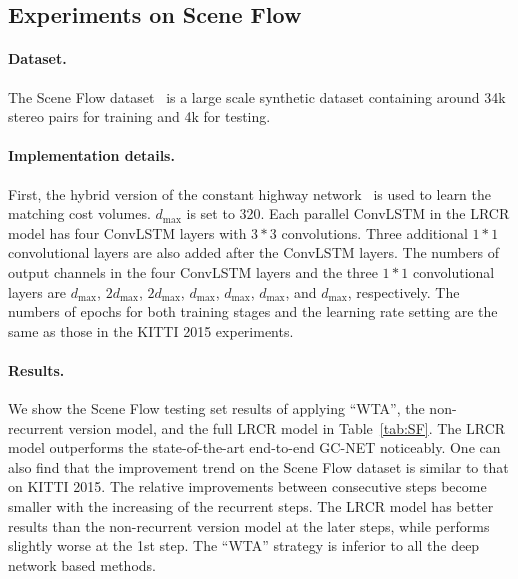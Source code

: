 \documentclass[10pt,twocolumn,letterpaper]{article}
\begin{document}
 \subsection{Experiments on Scene Flow}
 \label{sec:experimentSCENEFLOW}
\paragraph{Dataset.} The Scene Flow dataset~\cite{mayer2016large} is a large scale synthetic dataset containing around 34k stereo pairs for training and 4k for testing.
\vspace{-0.2cm}
\paragraph{Implementation details.} First, the hybrid version of the constant highway network~\cite{shaked2016improved} is used to learn the matching cost volumes. $d_{\mathrm{max}}$ is set to 320. Each parallel ConvLSTM in the LRCR model has four ConvLSTM layers with $3*3$ convolutions. Three additional $1*1$ convolutional layers are also added after the ConvLSTM layers. The numbers of output channels in the four ConvLSTM layers and the three $1*1$ convolutional layers are $d_{\mathrm{max}}$, $2d_{\mathrm{max}}$, $2d_{\mathrm{max}}$, $d_{\mathrm{max}}$, $d_{\mathrm{max}}$, $d_{\mathrm{max}}$, and $d_{\mathrm{max}}$, respectively. The numbers of epochs for both training stages and the learning rate setting are the same as those in the KITTI 2015 experiments.
\vspace{-0.4cm}
\paragraph{Results.} We show the Scene Flow testing set results of applying ``WTA'', the non-recurrent version model, and the full LRCR model in Table~\ref{tab:SF}. The LRCR model outperforms the state-of-the-art end-to-end GC-NET \cite{kendall2017end} noticeably. One can also find that the improvement trend on the Scene Flow dataset is similar to that on  KITTI 2015. The relative improvements between consecutive steps become smaller with the increasing of the recurrent steps. The LRCR model has better results than the non-recurrent version model at the later steps, while performs slightly worse at the 1st step. The ``WTA'' strategy is inferior to all the deep network based methods.
\end{document}
